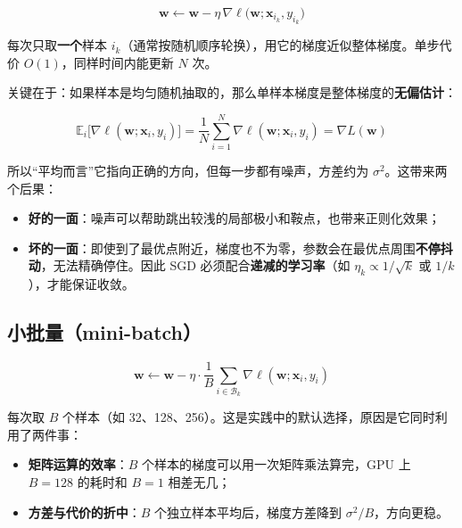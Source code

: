 \documentclass[UTF8, a4paper, zihao=-4, fontset=none]{ctexart}
\begin{document}
\[
\mathbf{w}\leftarrow\mathbf{w}-\eta\,\nabla\ell\big(\mathbf{w};\mathbf{x}_{i_k},y_{i_k}\big)
\]


每次只取\textbf{一个}样本 $i_k$（通常按随机顺序轮换），用它的梯度近似整体梯度。单步代价 $O(1)$，同样时间内能更新 $N$ 次。



关键在于：如果样本是均匀随机抽取的，那么单样本梯度是整体梯度的\textbf{无偏估计}：


\[
\mathbb{E}_{i}\big[\nabla\ell(\mathbf{w};\mathbf{x}_i,y_i)\big]=\frac{1}{N}\sum_{i=1}^{N}\nabla\ell(\mathbf{w};\mathbf{x}_i,y_i)=\nabla L(\mathbf{w})
\]


所以“平均而言”它指向正确的方向，但每一步都有噪声，方差约为 $\sigma^2$。这带来两个后果：



\begin{itemize}
\item \textbf{好的一面}：噪声可以帮助跳出较浅的局部极小和鞍点，也带来正则化效果；
\item \textbf{坏的一面}：即使到了最优点附近，梯度也不为零，参数会在最优点周围\textbf{不停抖动}，无法精确停住。因此 SGD 必须配合\textbf{递减的学习率}（如 $\eta_k\propto1/\sqrt{k}$ 或 $1/k$），才能保证收敛。
\end{itemize}




\subsection{小批量（mini-batch）}


\[
\mathbf{w}\leftarrow\mathbf{w}-\eta\cdot\frac{1}{B}\sum_{i\in\mathcal{B}_k}\nabla\ell(\mathbf{w};\mathbf{x}_i,y_i)
\]


每次取 $B$ 个样本（如 32、128、256）。这是实践中的默认选择，原因是它同时利用了两件事：



\begin{itemize}
\item \textbf{矩阵运算的效率}：$B$ 个样本的梯度可以用一次矩阵乘法算完，GPU 上 $B=128$ 的耗时和 $B=1$ 相差无几；
\item \textbf{方差与代价的折中}：$B$ 个独立样本平均后，梯度方差降到 $\sigma^2/B$，方向更稳。
\end{itemize}
\end{document}
